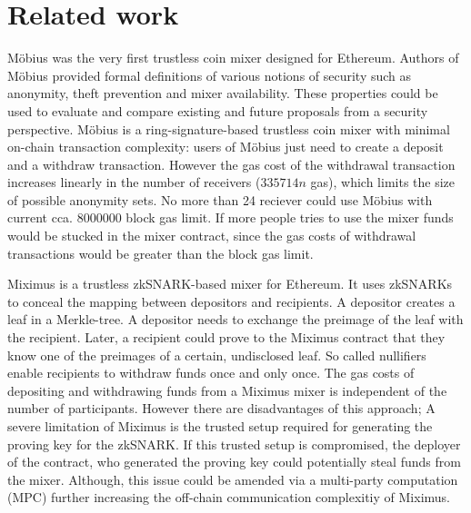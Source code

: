 \documentclass[conference, compsoc]{IEEEtran}
\theoremstyle{definition}
\begin{document}
\section{Related work}
Möbius was the very first trustless coin mixer designed for Ethereum\cite{meiklejohn2018mobius}. Authors of Möbius provided formal definitions of various notions of security such as anonymity, theft prevention and mixer availability. These properties could be used to evaluate and compare existing and future proposals from a security perspective. Möbius is a ring-signature-based trustless coin mixer with minimal on-chain transaction complexity: users of Möbius just need to create a deposit and a withdraw transaction. However the gas cost of the withdrawal transaction increases linearly in the number of receivers ($\num[group-separator={,}]{335714}n$ gas), which limits the size of possible anonymity sets. No more than 24 reciever could use Möbius with current cca. $\num[group-separator={,}]{8000000}$  block gas limit. If more people tries to use the mixer funds would be stucked in the mixer contract, since the gas costs of withdrawal transactions would be greater than the block gas limit.     

Miximus is a trustless zkSNARK-based mixer for Ethereum\cite{miximus2018}. It uses zkSNARKs to conceal the mapping between depositors and recipients. A depositor creates a leaf in a Merkle-tree. A depositor needs to exchange the preimage of the leaf with the recipient. Later, a recipient could prove to the Miximus contract that they know one of the preimages of a certain, undisclosed leaf. So called nullifiers enable recipients to withdraw funds once and only once. The gas costs of depositing and withdrawing funds from a Miximus mixer is independent of the number of participants. However there are disadvantages of this approach; A severe limitation of Miximus is the trusted setup required for generating the proving key for the zkSNARK. If this trusted setup is compromised, the deployer of the contract, who generated the proving key could potentially steal funds from the mixer. Although, this issue could be amended via a multi-party computation (MPC) further increasing the off-chain communication complexitiy of Miximus.
\end{document}
